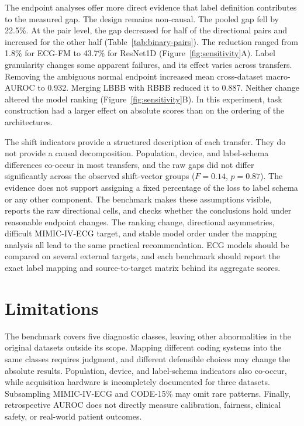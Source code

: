 \documentclass[conference]{IEEEtran}
\begin{document}
The endpoint analyses offer more direct evidence that label definition contributes to the measured gap. The design remains non-causal. The pooled gap fell by 22.5\%. At the pair level, the gap decreased for half of the directional pairs and increased for the other half (Table~\ref{tab:binary-pairs}). The reduction ranged from 1.8\% for ECG-FM to 43.7\% for ResNet1D (Figure~\ref{fig:sensitivity}A). Label granularity changes some apparent failures, and its effect varies across transfers. Removing the ambiguous normal endpoint increased mean cross-dataset macro-AUROC to 0.932. Merging LBBB with RBBB reduced it to 0.887. Neither change altered the model ranking (Figure~\ref{fig:sensitivity}B). In this experiment, task construction had a larger effect on absolute scores than on the ordering of the architectures.

The shift indicators provide a structured description of each transfer. They do not provide a causal decomposition. Population, device, and label-schema differences co-occur in most transfers, and the raw gaps did not differ significantly across the observed shift-vector groups ($F=0.14$, $p=0.87$). The evidence does not support assigning a fixed percentage of the loss to label schema or any other component. The benchmark makes these assumptions visible, reports the raw directional cells, and checks whether the conclusions hold under reasonable endpoint changes. The ranking change, directional asymmetries, difficult MIMIC-IV-ECG target, and stable model order under the mapping analysis all lead to the same practical recommendation. ECG models should be compared on several external targets, and each benchmark should report the exact label mapping and source-to-target matrix behind its aggregate scores.

\FloatBarrier
\section{Limitations}

The benchmark covers five diagnostic classes, leaving other abnormalities in the original datasets outside its scope. Mapping different coding systems into the same classes requires judgment, and different defensible choices may change the absolute results. Population, device, and label-schema indicators also co-occur, while acquisition hardware is incompletely documented for three datasets. Subsampling MIMIC-IV-ECG and CODE-15\% may omit rare patterns. Finally, retrospective AUROC does not directly measure calibration, fairness, clinical safety, or real-world patient outcomes.
\end{document}
